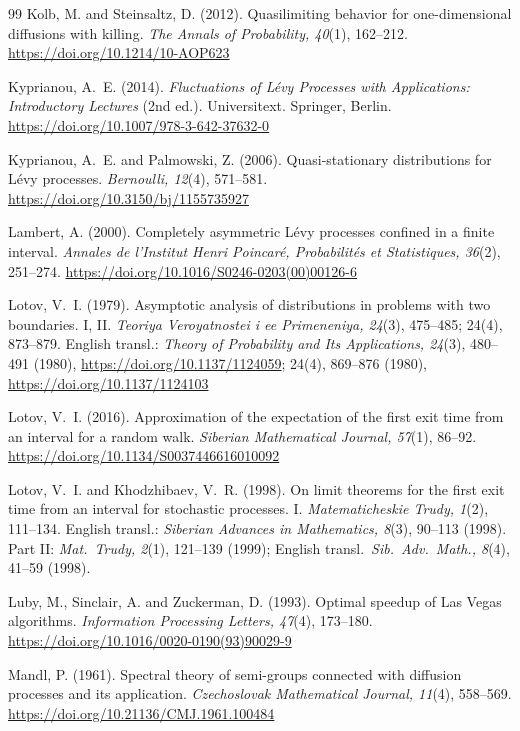 \documentclass[11pt,a4paper]{article}
\theoremstyle{definition}
\theoremstyle{remark}
\newcommand{\1}{\mathbf 1}
\begin{document}
\begin{thebibliography}{99}
Kolb, M. and Steinsaltz, D. (2012). Quasilimiting behavior for one-dimensional diffusions with killing. \emph{The Annals of Probability, 40}(1), 162--212. \url{https://doi.org/10.1214/10-AOP623}

Kyprianou, A.~E. (2014). \emph{Fluctuations of L\'evy Processes with Applications: Introductory Lectures} (2nd ed.). Universitext. Springer, Berlin. \url{https://doi.org/10.1007/978-3-642-37632-0}

Kyprianou, A.~E. and Palmowski, Z. (2006). Quasi-stationary distributions for L\'evy processes. \emph{Bernoulli, 12}(4), 571--581. \url{https://doi.org/10.3150/bj/1155735927}

Lambert, A. (2000). Completely asymmetric L\'evy processes confined in a finite interval. \emph{Annales de l'Institut Henri Poincar\'e, Probabilit\'es et Statistiques, 36}(2), 251--274. \url{https://doi.org/10.1016/S0246-0203(00)00126-6}

Lotov, V.~I. (1979). Asymptotic analysis of distributions in problems with two boundaries. I, II. \emph{Teoriya Veroyatnostei i ee Primeneniya, 24}(3), 475--485; 24(4), 873--879. English transl.: \emph{Theory of Probability and Its Applications, 24}(3), 480--491 (1980), \url{https://doi.org/10.1137/1124059}; 24(4), 869--876 (1980), \url{https://doi.org/10.1137/1124103}

Lotov, V.~I. (2016). Approximation of the expectation of the first exit time from an interval for a random walk. \emph{Siberian Mathematical Journal, 57}(1), 86--92. \url{https://doi.org/10.1134/S0037446616010092}

Lotov, V.~I. and Khodzhibaev, V.~R. (1998). On limit theorems for the first exit time from an interval for stochastic processes. I. \emph{Matematicheskie Trudy, 1}(2), 111--134. English transl.: \emph{Siberian Advances in Mathematics, 8}(3), 90--113 (1998). Part II: \emph{Mat.\ Trudy, 2}(1), 121--139 (1999); English transl.\ \emph{Sib.\ Adv.\ Math., 8}(4), 41--59 (1998).

Luby, M., Sinclair, A. and Zuckerman, D. (1993). Optimal speedup of Las Vegas algorithms. \emph{Information Processing Letters, 47}(4), 173--180. \url{https://doi.org/10.1016/0020-0190(93)90029-9}

Mandl, P. (1961). Spectral theory of semi-groups connected with diffusion processes and its application. \emph{Czechoslovak Mathematical Journal, 11}(4), 558--569. \url{https://doi.org/10.21136/CMJ.1961.100484}


\end{thebibliography}
\end{document}

